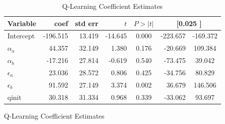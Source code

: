 \documentclass{article}
\begin{document}
\begin{table}[htbp]
    \begin{subfigure}[b]{0.9\textwidth}
        \centering
        \caption{Q-Learning Coefficient Estimates}
        \label{tab:q_ols_coefficients}
        \begin{tabular}{lrrrcrc}
            \toprule
            \textbf{Variable} & \textbf{coef} & \textbf{std err} & \textbf{$t$} & \textbf{$P>|t|$} & \multicolumn{2}{c}{\textbf{[0.025 \quad 0.975]}} \\ 
            \midrule
            Intercept & -196.515 & 13.419 & -14.645 & 0.000 & -223.657 & -169.372 \\
            $\alpha_a$ & 44.357 & 32.149 & 1.380 & 0.176 & -20.669 & 109.384 \\
            $\alpha_b$ & -17.216 & 27.814 & -0.619 & 0.540 & -73.475 & 39.042 \\
            $\epsilon_a$ & 23.036 & 28.572 & 0.806 & 0.425 & -34.756 & 80.829 \\
            $\epsilon_b$ & 91.592 & 27.149 & 3.374 & 0.002 & 36.679 & 146.506 \\
            qinit & 30.318 & 31.334 & 0.968 & 0.339 & -33.062 & 93.697 \\ 
            \bottomrule
        \end{tabular}
    \end{subfigure}

\end{table}
\end{document}
